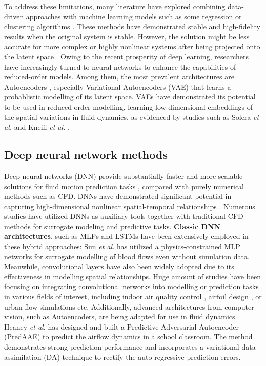 \documentclass[final-report]{article-template}
\begin{document}
To address these limitations, many literature have explored combining data-driven approaches with machine learning models such as some regression \cite{loiseau2018constrained, guo2018reduced, berzicnvs2020standardized} or clustering algorithms \cite{kaiser2014cluster, vishwakarma2008clustering}. These methods have demonstrated stable and high-fidelity results when the original system is stable. However, the solution might be less accurate for more complex or highly nonlinear systems after being projected onto the latent space \cite{dowell2023reduced, chen2021physics}. Owing to the recent prosperity of deep learning, researchers have increasingly turned to neural networks to enhance the capabilities of reduced-order models. Among them, the most prevalent architectures are Autoencoders \cite{solera2024beta, romor2023non}, especially Variational Autoencoders (VAE) that learns a probablistic modelling of its latent space. VAEs have demonstrated its potential to be used in reduced-order modelling, learning low-dimensional embeddings of the spatial variations in fluid dynamics, as evidenced by studies such as Solera \textit{et al.} \cite{solera2024beta} and Kneifl \textit{et al.} \cite{kneifl2023low}.   

\subsection{Deep neural network methods}
Deep neural networks (DNN) provide substantially faster and more scalable solutions for fluid motion prediction tasks \cite{zhou2020comparison}, compared with purely numerical methods such as CFD. DNNs have demonstrated significant potential in capturing high-dimensional nonlinear spatial-temporal relationships \cite{zhou2020comparison, sun2020surrogate}. Numerous studies have utilized DNNs as auxiliary tools together with traditional CFD methods for surrogate modeling and predictive tasks. \textbf{Classic DNN architectures}, such as MLPs and LSTMs have been extensively employed in these hybrid approaches: Sun \textit{et al.} \cite{sun2020surrogate} has utilized a physics-constrained MLP networks for surrogate modelling of blood flows even without simulation data. Meanwhile, convolutional layers have also been widely adopted due to its effectiveness in modelling spatial relationships. Huge amount of studies have been focusing on integrating convolutional networks into modelling or prediction tasks in various fields of interest, including indoor air quality control \cite{chen2021physics, calzolari2021deep}, airfoil design \cite{du2022airfoil}, or urban flow simulations \cite{tanaka2019optimization} etc. Additionally, advanced architectures from computer vision, such as Autoencoders, are being adapted for use in fluid dynamics. Heaney \textit{et al.} \cite{heaney2024data} has designed and built a Predictive Adversarial Autoencoder (PredAAE) to predict the airflow dynamics in a school classroom. The method demonstrates strong prediction performance and incorporates a variational data assimilation (DA) technique to rectify the auto-regressive prediction errors.\\
\end{document}
